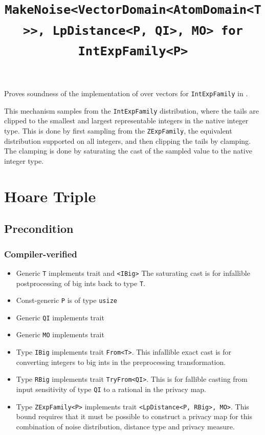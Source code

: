 \documentclass{article}
\title{\texttt{MakeNoise<VectorDomain<AtomDomain<T>>, LpDistance<P, QI>, MO> for IntExpFamily<P>}}
\author{\MichaelShoemateAuthor}
\date{}
\begin{document}
\maketitle

\contrib
Proves soundness of the implementation of  over vectors
for \texttt{IntExpFamily} in .

This mechanism samples from the \texttt{IntExpFamily} distribution,
where the tails are clipped to the smallest and largest representable integers in the native integer type.
This is done by first sampling from the \texttt{ZExpFamily}, the equivalent distribution supported on all integers,
and then clipping the tails by clamping.
The clamping is done by saturating the cast of the sampled value to the native integer type.

\section{Hoare Triple}
\subsection*{Precondition}
\subsubsection*{Compiler-verified}

\begin{itemize}
    \item Generic \texttt{T} implements trait  and \texttt{<IBig>}
        The saturating cast is for infallible postprocessing of big ints back to type \texttt{T}.
    \item Const-generic \texttt{P} is of type \texttt{usize}
    \item Generic \texttt{QI} implements trait 
    \item Generic \texttt{MO} implements trait 
    \item Type \texttt{IBig} implements trait \texttt{From<T>}.
        This infallible exact cast is for converting integers to big ints in the preprocessing transformation.
    \item Type \texttt{RBig} implements trait \texttt{TryFrom<QI>}.
        This is for fallible casting from input sensitivity of type \texttt{QI} to a rational in the privacy map.
    \item Type \texttt{ZExpFamily<P>} implements trait \texttt{<LpDistance<P, RBig>, MO>}.
        This bound requires that it must be possible to construct a privacy map for this combination of noise distribution, distance type and privacy measure.
\end{itemize}
\end{document}
